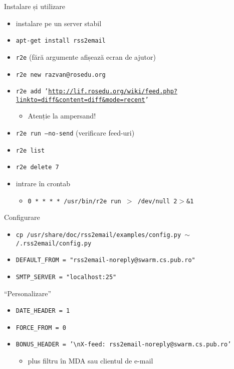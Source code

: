 \documentclass{beamer}
\begin{document}
\begin{frame}{Instalare și utilizare}
  \begin{itemize}
    \item instalare pe un server stabil
    \item \texttt{apt-get install rss2email}
    \item \texttt{r2e} (fără argumente afișează ecran de ajutor)
    \item \texttt{r2e new razvan@rosedu.org}
    \item \texttt{r2e add
    '\url{http://lif.rosedu.org/wiki/feed.php?linkto=diff\&content=diff\&mode=recent}'}
      \begin{itemize}
        \item Atenție la ampersand!
      \end{itemize}
    \item \texttt{r2e run --no-send} (verificare feed-uri)
    \item \texttt{r2e list}
    \item \texttt{r2e delete 7}
    \item intrare în crontab
      \begin{itemize}
        \item \texttt{0 * * * * /usr/bin/r2e run $>$ /dev/null 2$>$\&1}
      \end{itemize}
  \end{itemize}
\end{frame}

\begin{frame}{Configurare}
  \begin{itemize}
    \item \texttt{cp /usr/share/doc/rss2email/examples/config.py
    $\sim$/.rss2email/config.py}
    \item \texttt{DEFAULT\_FROM = "rss2email-noreply@swarm.cs.pub.ro"}
    \item \texttt{SMTP\_SERVER = "localhost:25"}
  \end{itemize}
\end{frame}

\begin{frame}{``Personalizare''}
  \begin{itemize}
    \item \texttt{DATE\_HEADER = 1}
    \item \texttt{FORCE\_FROM = 0}
    \item \texttt{BONUS\_HEADER = '\textbackslash{}nX-feed:
    rss2email-noreply@swarm.cs.pub.ro'}
      \begin{itemize}
        \item plus filtru în MDA sau clientul de e-mail
      \end{itemize}
  \end{itemize}
\end{frame}
\end{document}
